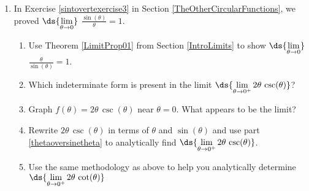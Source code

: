 \documentclass{ximera}
\begin{document}
\begin{enumerate}
\setcounter{enumi}{\value{HW}}

\item  In Exercise \ref{sintovertexercise3} in Section \ref{TheOtherCircularFunctions}, we proved $\ds{\lim_{\theta \rightarrow 0}}$ $\frac{\sin(\theta)}{\theta} = 1$.

\begin{enumerate}

\item \label{thetaoversinetheta} Use Theorem \ref{LimitProp01} from Section \ref{IntroLimits} to show  $\ds{\lim_{\theta \rightarrow 0}}$ $\frac{\theta}{\sin(\theta)} = 1$.

\smallskip


\item  Which indeterminate form is present in the limit $\ds{\lim_{\theta \rightarrow 0^{+}} 2 \theta \, \csc(\theta)}$?

\smallskip

\item  Graph $f(\theta) = 2 \theta \, \csc(\theta)$ near $\theta = 0$.  What appears to be the limit?

\smallskip

\item  Rewrite $2 \theta \, \csc(\theta)$ in terms of $\theta$ and $\sin(\theta)$ and use part \ref{thetaoversinetheta} to analytically find $\ds{\lim_{\theta \rightarrow 0^{+}} 2 \theta \, \csc(\theta)}$.

\item  Use the same methodology as above  to help you analytically determine $\ds{\lim_{\theta \rightarrow 0^{+}} 2 \theta \, \cot(\theta)}$

\end{enumerate}

\setcounter{HW}{\value{enumi}}
\end{enumerate}
\end{document}
